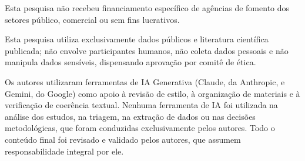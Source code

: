 \documentclass[brazilian]{sbc2025}
\begin{document}
\begin{declarations}
\begin{funding}
Esta pesquisa não recebeu financiamento específico de agências de fomento dos
setores público, comercial ou sem fins lucrativos. %
\end{funding}

\begin{furtherinformation}
Esta pesquisa utiliza exclusivamente dados públicos e literatura científica
publicada; não envolve participantes humanos, não coleta dados pessoais e não
manipula dados sensíveis, dispensando aprovação por comitê de ética.

Os autores utilizaram ferramentas de IA Generativa (Claude, da Anthropic, e Gemini, do Google) como apoio à revisão de estilo, à organização de materiais e à verificação de coerência textual. Nenhuma ferramenta de IA foi utilizada na análise dos estudos, na triagem, na extração de dados ou nas decisões metodológicas, que foram conduzidas exclusivamente pelos autores. Todo o conteúdo final foi revisado e validado pelos autores, que assumem responsabilidade integral por ele.
\end{furtherinformation}

\end{declarations}



\end{document}
